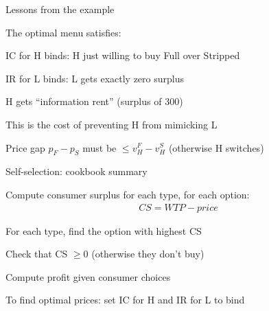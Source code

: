 \documentclass[notes,11pt, aspectratio=169]{beamer}
\newenvironment{wideitemize}{\itemize\addtolength{\itemsep}{10pt}}{\enditemize}
\newenvironment{wideenumerate}{\enumerate\addtolength{\itemsep}{10pt}}{\endenumerate}
\begin{document}
\begin{frame}{Lessons from the example}
	\begin{wideitemize}
		\item The optimal menu satisfies:
		\begin{wideenumerate}
			\vspace{5pt}
			\item IC for H binds: H just willing to buy Full over Stripped
			\item IR for L binds: L gets exactly zero surplus
		\end{wideenumerate}
		\item H gets ``information rent'' (surplus of 300)
		\begin{wideitemize}
			\vspace{5pt}
			\item This is the cost of preventing H from mimicking L
		\end{wideitemize}
		\item Price gap $p_F - p_S$ must be $\leq v_H^F - v_H^S$ (otherwise H switches)
	\end{wideitemize}
\end{frame}

\begin{frame}{Self-selection: cookbook summary}
	\begin{wideenumerate}
		\item Compute consumer surplus for each type, for each option:
		\begin{align*}
			CS = WTP - price
		\end{align*}
		\item For each type, find the option with highest CS
		\item Check that CS $\geq 0$ (otherwise they don't buy)
		\item Compute profit given consumer choices
		\item To find optimal prices: set IC for H and IR for L to bind
	\end{wideenumerate}
\end{frame}

\end{document}
